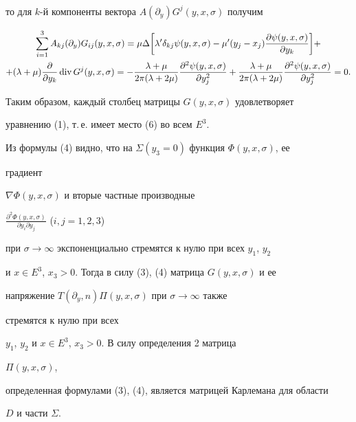 \begin{pf}
\begin{gather*}
\end{gather*} 


то для $k$-й компоненты вектора $A(\partial_y)G^j(y,x,\sigma)$ получим 


\begin{gather*} 


\sum^3_{i=1}A_{kj}(\partial_y)G_{ij}(y,x,\sigma)=\mu\Delta\bigg[ 


\lambda'\delta_{kj}\psi(y,x,\sigma)-\mu'(y_j-x_j) 


\frac{\partial\psi(y,x,\sigma)}{\partial y_k}\bigg]+ \\ 


% 


+(\lambda+\mu)\frac{\partial}{\partial y_k}\Div G^j(y,x,\sigma)= 


-\frac{\lambda+\mu}{2\pi(\lambda+2\mu)} 


\frac{\partial^2\psi(y,x,\sigma)}{\partial y^2_j}+ 


\frac{\lambda+\mu}{2\pi(\lambda+2\mu)} 


\frac{\partial^2\psi(y,x,\sigma)}{\partial y^2_j}=0. 


\end{gather*} 


Таким образом, каждый столбец матрицы $G(y,x,\sigma)$ удовлетворяет 


уравнению (1), т.\,е. имеет место (6) во всем $E^3$. 


 


Из формулы (4) видно, что на $\Sigma(y_3=0)$ функция $\Phi(y,x,\sigma)$, ее 


градиент 


$\nabla\Phi(y,x,\sigma)$ и вторые частные производные 


$\frac{\partial^2\Phi(y,x,\sigma)}{\partial y_i\partial y_j}$ ($i,j=1,2,3$) 


при $\sigma\to\infty$ экспоненциально стремятся к нулю при всех $y_1$, $y_2$


и $x\in E^3$, $x_3>0$. Тогда в силу (3), (4) матрица $G(y,x,\sigma)$ и ее 


напряжение $T(\partial_y,n)\Pi(y,x,\sigma)$ при $\sigma\to\infty$ также 


стремятся к нулю при всех 


$y_1$, $y_2$ и $x\in E^3$, $x_3>0$. В силу определения 2 матрица 


$\Pi(y,x,\sigma)$, 


определенная формулами (3), (4), является матрицей Карлемана для области 


$D$ и части $\Sigma$. 


\end{pf} 



